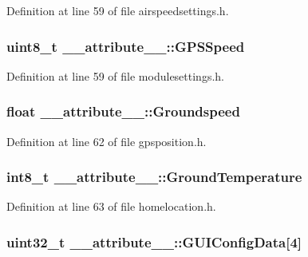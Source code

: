 \-Definition at line 59 of file airspeedsettings.\-h.

\hypertarget{struct____attribute_____ac5ed8c5cec33c83e0c62711ba8e92558}{
\subsubsection[{\-G\-P\-S\-Speed}]{\setlength{\rightskip}{0pt plus 5cm}uint8\-\_\-t {\bf \-\_\-\-\_\-attribute\-\_\-\-\_\-\-::\-G\-P\-S\-Speed}}}\label{struct____attribute_____ac5ed8c5cec33c83e0c62711ba8e92558}


\-Definition at line 59 of file modulesettings.\-h.

\hypertarget{struct____attribute_____a2964b1145bc1ce85e4c33999f7a2dee5}{
\subsubsection[{\-Groundspeed}]{\setlength{\rightskip}{0pt plus 5cm}float {\bf \-\_\-\-\_\-attribute\-\_\-\-\_\-\-::\-Groundspeed}}}\label{struct____attribute_____a2964b1145bc1ce85e4c33999f7a2dee5}


\-Definition at line 62 of file gpsposition.\-h.

\hypertarget{struct____attribute_____a4a42cf075f9ac9ec1248dbcdb3e2d968}{
\subsubsection[{\-Ground\-Temperature}]{\setlength{\rightskip}{0pt plus 5cm}int8\-\_\-t {\bf \-\_\-\-\_\-attribute\-\_\-\-\_\-\-::\-Ground\-Temperature}}}\label{struct____attribute_____a4a42cf075f9ac9ec1248dbcdb3e2d968}


\-Definition at line 63 of file homelocation.\-h.

\hypertarget{struct____attribute_____a6e4119c2472849d347422e0dd081cb7c}{
\subsubsection[{\-G\-U\-I\-Config\-Data}]{\setlength{\rightskip}{0pt plus 5cm}uint32\-\_\-t {\bf \-\_\-\-\_\-attribute\-\_\-\-\_\-\-::\-G\-U\-I\-Config\-Data}\mbox{[}4\mbox{]}}}\label{struct____attribute_____a6e4119c2472849d347422e0dd081cb7c}


